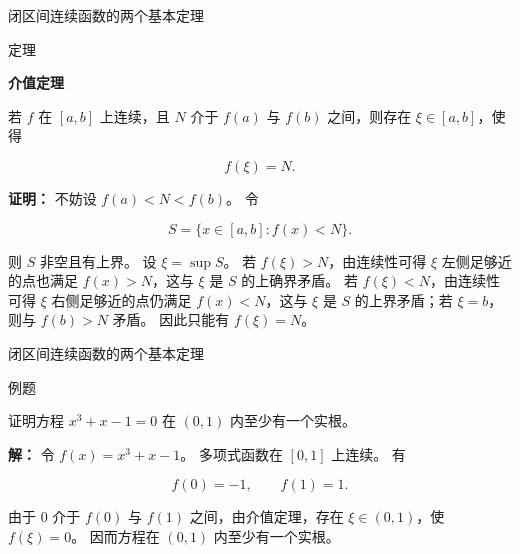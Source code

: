 \documentclass[aspectratio=169,10pt,fontset=fandol]{ctexbeamer}
\begin{document}
\begin{frame}[t,fragile]{闭区间连续函数的两个基本定理}
\normalsize
\begin{block}{定理}
{\normalsize
\textbf{介值定理}\par


若 $f$ 在 $[a,b]$ 上连续，且 $N$ 介于 $f(a)$ 与 $f(b)$ 之间，则存在 $\xi\in[a,b]$，使得

\[

f(\xi)=N.

\]


}
\end{block}
\pause
{\normalsize
\textbf{证明：}
不妨设 $f(a)<N<f(b)$。 令

\[

S=\{x\in[a,b]:f(x)<N\}.

\]

则 $S$ 非空且有上界。 设 $\xi=\sup S$。 若 $f(\xi)>N$，由连续性可得 $\xi$ 左侧足够近的点也满足 $f(x)>N$，这与 $\xi$ 是 $S$ 的上确界矛盾。 若 $f(\xi)<N$，由连续性可得 $\xi$ 右侧足够近的点仍满足 $f(x)<N$，这与 $\xi$ 是 $S$ 的上界矛盾；若 $\xi=b$，则与 $f(b)>N$ 矛盾。 因此只能有 $f(\xi)=N$。


}
\end{frame}
\begin{frame}[t,fragile]{闭区间连续函数的两个基本定理}
\normalsize
\begin{block}{例题}
{\normalsize
证明方程 $x^3+x-1=0$ 在 $(0,1)$ 内至少有一个实根。


}
\end{block}
\pause
{\normalsize
\textbf{解：}
令 $f(x)=x^3+x-1$。 多项式函数在 $[0,1]$ 上连续。 有

\[

f(0)=-1,\qquad f(1)=1.

\]

由于 $0$ 介于 $f(0)$ 与 $f(1)$ 之间，由介值定理，存在 $\xi\in(0,1)$，使 $f(\xi)=0$。 因而方程在 $(0,1)$ 内至少有一个实根。


}
\end{frame}
\end{document}
